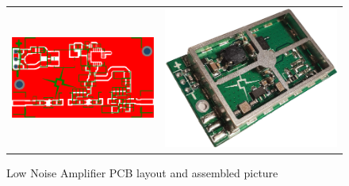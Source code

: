 \begin{figure}
   \centering
\begin{tabular}{cc}
        \includegraphics[width=0.4\paperwidth]{img/5/lna_pcb.eps}
    & 
        \includegraphics[width=0.3\paperwidth]{img/5/lna_assembled.jpg}
\end{tabular}
\label{lna_pcb}
\caption{Low Noise Amplifier PCB layout and assembled picture}
\end{figure}

